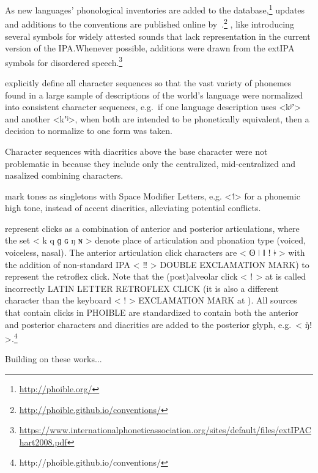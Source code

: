 As new languages' phonological inventories are added to the 
database,\footnote{\url{http://phoible.org/}} updates and additions to the 
conventions are published online by~\cite{MoranMcCloy2014}.\footnote{
\url{http://phoible.github.io/conventions/}} , like 
introducing several symbols for widely attested sounds that lack representation 
in the current version of the IPA.\@ Whenever possible, additions were drawn from 
the extIPA symbols for disordered speech.\footnote{\url{https://www.internationalphoneticassociation.org/sites/default/files/extIPAChart2008.pdf}}

\cite{MoranMcCloy2014} explicitly define all character sequences so that the
vast variety of phonemes found in a large sample of descriptions of the world's
language were normalized into consistent character sequences, e.g.~if one
language description uses <kʲʼ> and another <kʼʲ>, when both are intended to be
phonetically equivalent, then a decision to normalize to one form was taken. 

Character sequences with diacritics above the base character were not
problematic in \citet{Moran2012} because they include only the centralized,
mid-centralized and nasalized combining characters. 

\citet{Moran2012;MoranMcCloy2014} mark tones as singletons with Space Modifier
Letters, e.g. <˦> for a phonemic high tone, instead of accent diacritics,
alleviating potential conflicts. 

\citet{Moran2012;MoranMcCloy2014} represent clicks as a combination of anterior and 
posterior articulations, where the set < k q ɡ ɢ ŋ ɴ > denote place of articulation 
and phonation type (voiced, voiceless, nasal). The anterior articulation click characters 
are < ʘ ǀ ǁ ǃ ǂ > with the addition of non-standard IPA < ‼ > \textsc{DOUBLE EXCLAMATION MARK)} 
 to represent the retroflex click. Note that the (post)alveolar click < ǃ > at  
is called incorrectly \textsc{LATIN LETTER RETROFLEX CLICK} (it is also a different character than 
the keyboard < ! > \textsc{EXCLAMATION MARK} at ). All sources that contain clicks in 
PHOIBLE are standardized to contain both the anterior and posterior characters and diacritics 
are added to the posterior glyph, e.g.\ < ŋ̊ǃ >.\footnote{http://phoible.github.io/conventions/}

Building on these works...



